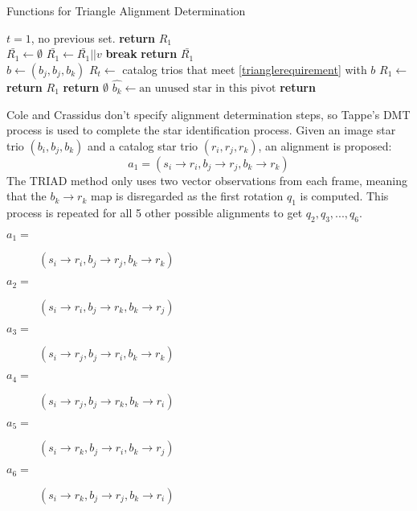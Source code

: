 \begin{algorithm}
\caption{Functions for Triangle Alignment Determination} \label{Triangle Helpers}
\begin{algorithmic}[1]
 \Comment $t = 1$, no previous set.
\State \textbf{return} $R_1$ 
\EndIf
\\
\State $\bar{R_1} \gets \emptyset$ 
\State $\bar{R_1} \gets \bar{R_1} || v$
\State \textbf{break}
\EndIf
\EndFor
\EndFor
\State \textbf{return} $\bar{R_1}$
\EndFunction
\\

\State $b \gets (b_j, b_j, b_k)$
\State $R_t \gets $ catalog trios that meet \eqref{trianglerequirement} with $b$
\State $R_1 \gets $ 
\\

\State \textbf{return} $R_1$
\State \textbf{return} $\emptyset$
\Else
\State $\hat{b_k} \gets \text{an unused star in this pivot}$
\State \textbf{return} 
\EndIf
\EndFunction
\end{algorithmic}
\end{algorithm}

Cole and Crassidus don't specify alignment determination steps, so Tappe's DMT process is used to complete the star identification process. Given an image star trio $(b_i, b_j, b_k)$ and a catalog star trio $(r_i, r_j, r_k)$, an alignment is proposed:
\begin{equation}
a_1 = (s_i \rightarrow r_i, b_j \rightarrow r_j, b_k \rightarrow r_k)
\end{equation}
The TRIAD method only uses two vector observations from each frame, meaning that the $b_k \rightarrow r_k$ map is disregarded as the first rotation $q_1$ is computed. This process is repeated for all 5 other possible alignments to get $q_2, q_3, ..., q_6$.
\begin{description}
\item [$a_1 = $] $(s_i \rightarrow r_i, b_j \rightarrow r_j, b_k \rightarrow r_k)$
\item [$a_2 = $] $(s_i \rightarrow r_i, b_j \rightarrow r_k, b_k \rightarrow r_j)$
\item [$a_3 = $] $(s_i \rightarrow r_j, b_j \rightarrow r_i, b_k \rightarrow r_k)$
\item [$a_4 = $] $(s_i \rightarrow r_j, b_j \rightarrow r_k, b_k \rightarrow r_i)$
\item [$a_5 = $] $(s_i \rightarrow r_k, b_j \rightarrow r_i, b_k \rightarrow r_j)$
\item [$a_6 = $] $(s_i \rightarrow r_k, b_j \rightarrow r_j, b_k \rightarrow r_i)$
\end{description}

